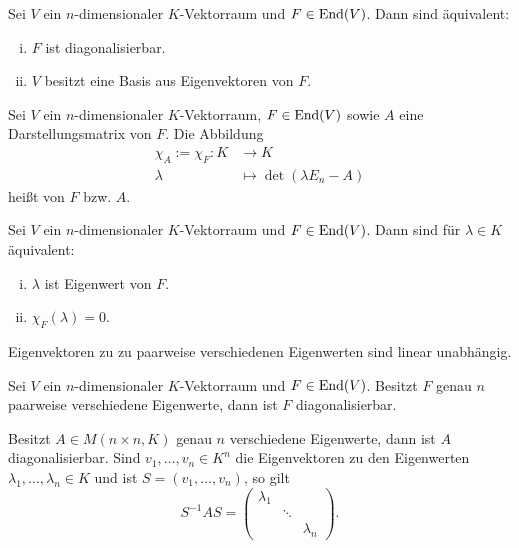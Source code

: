 \setcounter{satz}{8}
\begin{satz}
	\label{satz:I.16.9}
	Sei $V$ ein $n$-dimensionaler $K$-Vektorraum und $F \in \operatorname{End}(V)$.
	Dann sind äquivalent:
	\begin{enumerate}[(i)]
		\item $F$ ist diagonalisierbar.
		\item $V$ besitzt eine Basis aus Eigenvektoren von $F$.
	\end{enumerate}
\end{satz}

\setcounter{satz}{10}
\begin{definition}
	\label{def:I.16.11}
	Sei $V$ ein $n$-dimensionaler $K$-Vektorraum, $F \in \operatorname{End}(V)$ sowie $A$ eine Darstellungsmatrix von $F$.
	Die Abbildung
	\begin{align*}
		\chi_A := \chi_F \colon K &\longrightarrow K \\
		\lambda &\longmapsto \det(\lambda E_n - A)
	\end{align*}
	heißt  von $F$ bzw. $A$.
\end{definition}

\begin{satz}
	\label{satz:I.16.12}
	Sei $V$ ein $n$-dimensionaler $K$-Vektorraum und $F \in \operatorname{End}(V)$.
	Dann sind für $\lambda \in K$ äquivalent:
	\begin{enumerate}[(i)]
		\item $\lambda$ ist Eigenwert von $F$.
		\item $\chi_F(\lambda) = 0$.
	\end{enumerate}
\end{satz}

\setcounter{satz}{13}
\begin{lemma}
	\label{def:I.16.14}
	Eigenvektoren zu zu paarweise verschiedenen Eigenwerten sind linear unabhängig.
\end{lemma}

\begin{satz}
	\label{satz:I.16.15}
	Sei $V$ ein $n$-dimensionaler $K$-Vektorraum und $F \in \operatorname{End}(V)$.
	Besitzt $F$ genau $n$ paarweise verschiedene Eigenwerte, dann ist $F$ diagonalisierbar.
\end{satz}

\begin{satz}
	\label{satz:I.16.16}
	Besitzt $A \in M(n \times n,K)$ genau $n$ verschiedene Eigenwerte, dann ist $A$ diagonalisierbar.
	Sind $v_1,\dots,v_n \in K^n$ die Eigenvektoren zu den Eigenwerten $\lambda_1,\dots,\lambda_n \in K$ und ist $S = (v_1,\dots,v_n)$, so gilt
	\[
		S^{-1}AS = \begin{pmatrix}
		\lambda_1 &  &  \\ 
		& \ddots &  \\ 
		&  & \lambda_n
		\end{pmatrix}.
	\]
\end{satz}

